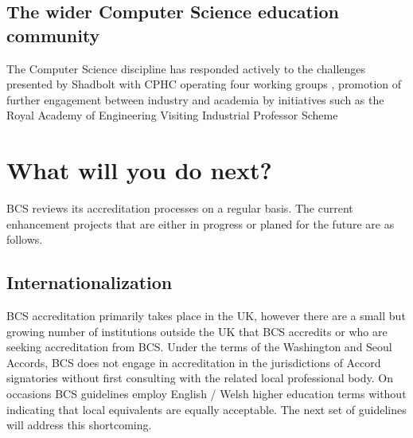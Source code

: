 \documentclass[sigconf]{acmart}
\begin{document}
\subsection{The wider Computer Science education community}
The Computer Science discipline has responded actively to the challenges presented by Shadbolt with CPHC operating four working groups \cite{cphc_2016},  promotion of further engagement between industry and academia by initiatives such as the Royal Academy of Engineering Visiting Industrial Professor Scheme \cite{royal}

\section {What will you do next?}	

BCS reviews its accreditation processes on a regular basis. The current enhancement projects that are either in progress or planed for the future are as follows.

\subsection{Internationalization}
BCS accreditation primarily takes place in the UK, however there are a small but growing number of institutions outside the UK that BCS accredits or who are seeking accreditation from BCS. Under the terms of the Washington and Seoul Accords, BCS does not engage in accreditation in the jurisdictions of Accord signatories without first consulting with the related local professional body.  On occasions BCS guidelines employ English / Welsh higher education terms without indicating that local equivalents are equally acceptable. The next set of guidelines will address this shortcoming.
\end{document}
